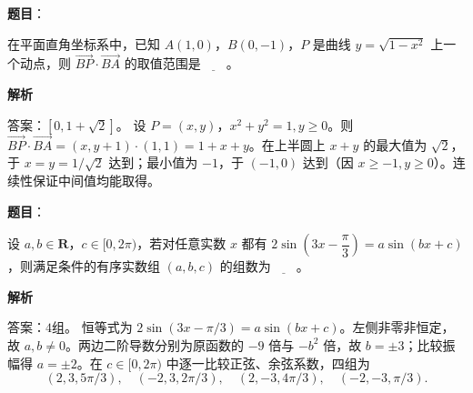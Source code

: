 \begin{answer}

\textbf{题目}：

在平面直角坐标系中，已知 \(A(1,0)\)，\(B(0,-1)\)，\(P\) 是曲线 \(y=\sqrt{1-x^2}\) 上一个动点，则 \(\overrightarrow{BP}\cdot\overrightarrow{BA}\) 的取值范围是\(\underline{\qquad}\)。

\textbf{解析}

答案：\([0,1+\sqrt2]\)。
设 \(P=(x,y)\)，\(x^2+y^2=1,y\ge0\)。则 \(\overrightarrow{BP}\cdot\overrightarrow{BA}=(x,y+1)\cdot(1,1)=1+x+y\)。在上半圆上 \(x+y\) 的最大值为 \(\sqrt2\)，于 \(x=y=1/\sqrt2\) 达到；最小值为 \(-1\)，于 \((-1,0)\) 达到（因 \(x\ge-1,y\ge0\)）。连续性保证中间值均能取得。


\end{answer}
\begin{answer}

\textbf{题目}：

设 \(a,b\in\mathbf{R}\)，\(c\in[0,2\pi)\)，若对任意实数 \(x\) 都有 \(2\sin\left(3x-\dfrac{\pi}{3}\right)=a\sin(bx+c)\)，则满足条件的有序实数组 \((a,b,c)\) 的组数为\(\underline{\qquad}\)。

\textbf{解析}

答案：\(4\)组。
恒等式为 \(2\sin(3x-\pi/3)=a\sin(bx+c)\)。左侧非零非恒定，故 \(a,b\ne0\)。两边二阶导数分别为原函数的 \(-9\) 倍与 \(-b^2\) 倍，故 \(b=\pm3\)；比较振幅得 \(a=\pm2\)。在 \(c\in[0,2\pi)\) 中逐一比较正弦、余弦系数，四组为
\nopagebreak[4]
\[
(2,3,5\pi/3),\quad(-2,3,2\pi/3),\quad(2,-3,4\pi/3),\quad(-2,-3,\pi/3).
\]


\end{answer}
